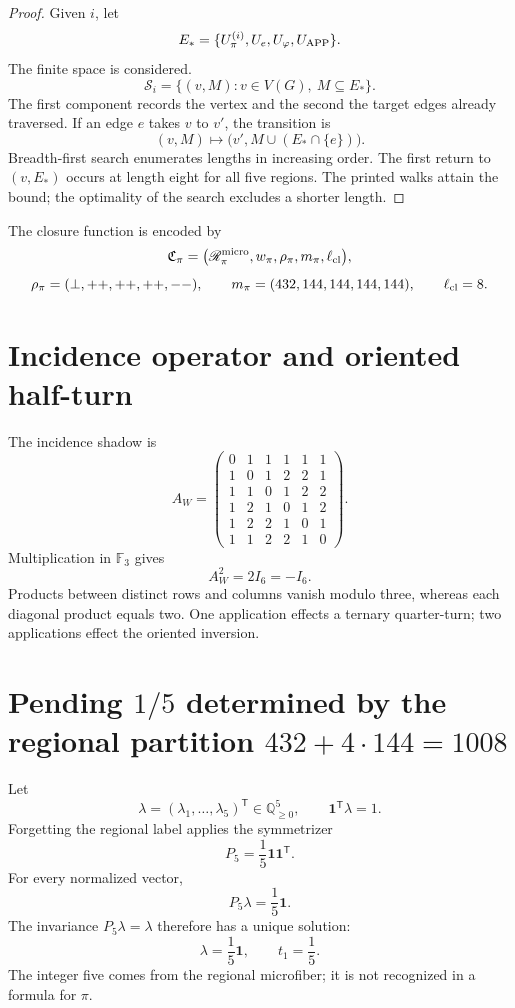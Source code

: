\begin{proof}
Given \(i\), let
\[
 E_*=\{U_\pi^{(i)},U_e,U_\varphi,U_{\rm APP}\}.
\]
The finite space is considered.
\[
 \mathscr S_i=\{(v,M):v\in V(G),\ M\subseteq E_*\}.
\]
The first component records the vertex and the second the target edges
already traversed. If an edge \(e\) takes \(v\) to \(v'\), the transition is
\[
 (v,M)\longmapsto
 \bigl(v',M\cup(E_*\cap\{e\})\bigr).
\]
Breadth-first search enumerates lengths in increasing order. The first
return to \((v,E_*)\) occurs at length eight for all five regions.
The printed walks attain the bound; the optimality of the search excludes
a shorter length.
\end{proof}

The closure function is encoded by
\[
 \mathfrak C_\pi=
 \bigl(\mathscr R_\pi^{\rm micro},
 w_\pi,\rho_\pi,m_\pi,\ell_{\rm cl}\bigr),
\]
\[
 \rho_\pi=(\perp,++ ,++ ,++ ,--),
 \qquad
 m_\pi=(432,144,144,144,144),
 \qquad
 \ell_{\rm cl}=8.
\]

\section{Incidence operator and oriented half-turn}

The incidence shadow is
\[
 A_W=
 \begin{pmatrix}
 0&1&1&1&1&1\\
 1&0&1&2&2&1\\
 1&1&0&1&2&2\\
 1&2&1&0&1&2\\
 1&2&2&1&0&1\\
 1&1&2&2&1&0
 \end{pmatrix}.
\]
Multiplication in \(\mathbb F_3\) gives
\begin{equation}
 \boxed{A_W^2=2I_6=-I_6.}
 \label{gfp:b:eq:aw-cuadrado-menos-identidad-pi}
\end{equation}
Products between distinct rows and columns vanish modulo three,
whereas each diagonal product equals two. One application effects a ternary
quarter-turn; two applications effect the oriented inversion.

\section{Pending \texorpdfstring{\(1/5\)}{1/5} determined by the regional partition \(432+4\cdot144=1008\)}

Let
\[
 \lambda=(\lambda_1,\ldots,\lambda_5)^{\mathsf T}
 \in\mathbb Q_{\geq0}^5,
 \qquad
 \mathbf1^{\mathsf T}\lambda=1.
\]
Forgetting the regional label applies the symmetrizer
\[
 P_5=\frac15\mathbf1\mathbf1^{\mathsf T}.
\]
For every normalized vector,
\[
 P_5\lambda=\frac15\mathbf1.
\]
The invariance \(P_5\lambda=\lambda\) therefore has a unique solution:
\begin{equation}
 \boxed{\lambda=\frac15\mathbf1,\qquad t_1=\frac15.}
 \label{gfp:b:eq:pendiente-primitiva-pi}
\end{equation}
The integer five comes from the regional microfiber; it is not recognized in a
formula for \(\pi\).

